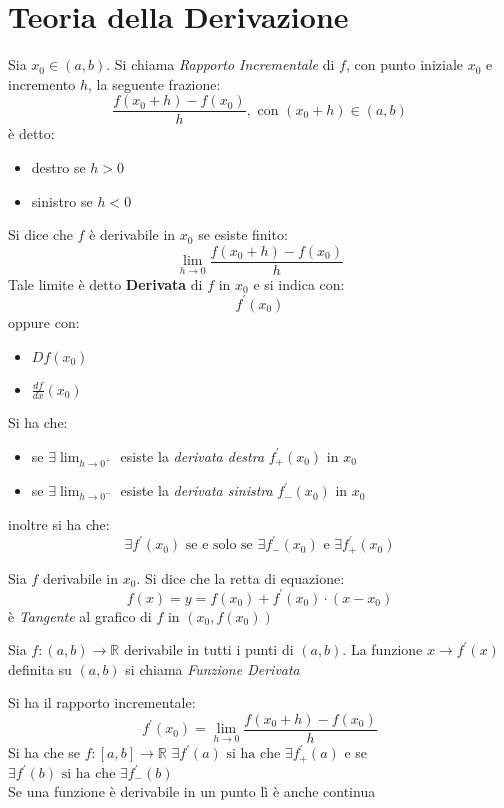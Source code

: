 \documentclass[a4paper,12pt, oneside]{book}
\begin{document}
\section{Teoria della Derivazione}
\begin{shaded}
Sia $x_0\in(a,b)$. Si chiama \textit{Rapporto Incrementale} di $f$, con punto iniziale $x_0$ e incremento $h$, la seguente frazione:
$$\frac{f(x_0+h)-f(x_0)}{h}, \mbox{ con } (x_0+h)\in (a,b)$$
è detto:
\begin{itemize}
\item destro se $h>0$
\item sinistro se $h<0$
\end{itemize}
\end{shaded}
\begin{definizione}
Si dice che $f$ è derivabile in $x_0$ se esiste finito:
$$\lim_{h\rightarrow 0} \frac{f(x_0+h)-f(x_0)}{h}$$
Tale limite è detto \textbf{Derivata} di $f$ in $x_0$ e si indica con:
$$f^{'}(x_0)$$
oppure con:
\begin{itemize}
\item $Df(x_0)$
\item $\frac{df}{dx}(x_0)$
\end{itemize}
\newpage
Si ha che:
\begin{itemize}
\item se $\exists \lim_{h\rightarrow 0^{+}}$ esiste la \textit{derivata destra} $f_{+}^{'}(x_0)$ in $x_0$
\item se $\exists \lim_{h\rightarrow 0^{-}}$ esiste la \textit{derivata sinistra} $f_{-}^{'}(x_0)$ in $x_0$
\end{itemize}
inoltre si ha che:
$$\exists f^{'}(x_0) \mbox{ se e solo se } \exists f_{-}^{'}(x_0) \mbox{ e } \exists f_{+}^{'}(x_0)$$
\end{definizione}
\begin{definizione}
Sia $f$ derivabile in $x_0$. Si dice che la retta di equazione:
$$f(x)=y=f(x_0)+f^{'}(x_0)\cdot (x-x_0)$$
è \textit{Tangente} al grafico di $f$ in $(x_0,f(x_0))$
\end{definizione}
\begin{definizione}
Sia $f:(a,b)\rightarrow \mathbb{R}$ derivabile in tutti i punti di $(a,b)$. La funzione $x\rightarrow f^{'}(x)$ definita su $(a,b)$ si chiama \textit{Funzione Derivata}
\end{definizione}
Si ha il rapporto incrementale: $$f^{'}(x_0)=\lim_{h\rightarrow 0}\frac{f(x_0+h)-f(x_0)}{h}$$
Si ha che se $f:[a,b]\rightarrow \mathbb{R}$ $\exists f^{'} (a) \mbox{ si ha che  }\exists f^{'}_{+} (a)$ e se $\exists f^{'} (b) \mbox{ si ha che }\exists f^{'}_{-} (b)$\\
Se una funzione è derivabile in un punto lì è anche continua
\end{document}

